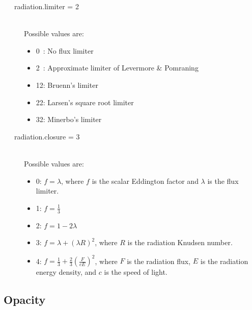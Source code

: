 \documentclass[11pt,letterpaper]{article}
\begin{document}
\begin{description}
\item[\ \ \ radiation.limiter = 2] \hfill \\
  Possible values are:
  \begin{itemize}
    \item 0\ : No flux limiter
    \item 2\ : Approximate limiter of Levermore \& Pomraning
    \item 12: Bruenn's limiter
    \item 22: Larsen's square root limiter
    \item 32: Minerbo's limiter
  \end{itemize}
\item[\ \ \ radiation.closure = 3] \hfill \\
  Possible values are:
  \begin{itemize}
    \item 0: $f = \lambda$, where $f$ is the scalar Eddington factor
      and $\lambda$ is the flux limiter. 
    \item 1: $f = \frac{1}{3}$ 
    \item 2: $f = 1 - 2 \lambda$ 
    \item 3: $f = \lambda + (\lambda R)^2$, where $R$ is the radiation
      Knudsen number. 
    \item 4: $f = \frac{1}{3} + \frac{2}{3} (\frac{F}{cE})^2$, where
      $F$ is the radiation flux, $E$ is the radiation energy density,
      and $c$ is the speed of light.
  \end{itemize}
\end{description}

\subsection{Opacity}
\label{sec:opacpars}
\end{document}
